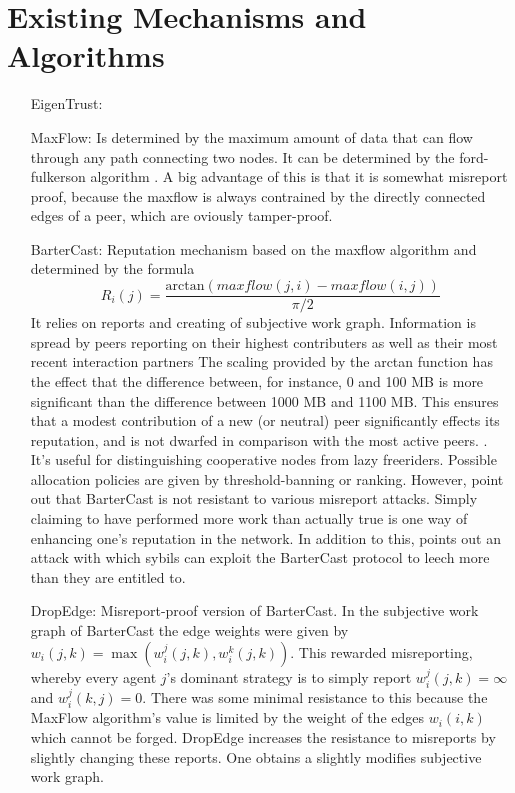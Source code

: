 \documentclass[11pt,a4paper]{article}
\theoremstyle{definition}
\theoremstyle{theorem}
\theoremstyle{proposition}
\theoremstyle{corollary}
\theoremstyle{lemma}
\theoremstyle{example}
\theoremstyle{remark}
\begin{document}
\section{Existing Mechanisms and Algorithms}
\label{sec:Existing Mechanisms and Algorithms}
\begin{enumerate}
\item[EigenTrust:]
\item[MaxFlow:] Is determined by the maximum amount of data that can flow through any path connecting two nodes. It can be determined by the ford-fulkerson algorithm \cite{Bartercast: A Practical Approach to Prevent Lazy Freeriding in P2P Networks}. A big advantage of this is that it is somewhat misreport proof, because the maxflow is always contrained by the directly connected edges of a peer, which are oviously tamper-proof. 
\item[BarterCast:]Reputation mechanism based on the maxflow algorithm and determined by the formula 
\begin{equation}
R_i(j)=\frac{\textrm{arctan}(maxflow(j,i)-maxflow(i,j))}{\pi/2}
\end{equation}
It relies on reports and creating of subjective work graph. Information is spread by peers reporting on their highest contributers as well as their most recent interaction partners
The scaling provided by the arctan function has the effect that the difference between, for instance, 0 and 100 MB is more significant than the difference between 1000 MB and 1100 MB. This ensures that a modest contribution of a new (or neutral) peer significantly effects its reputation, and is not dwarfed in comparison with the most active peers. \cite{Bartercast: A Practical Approach to Prevent Lazy Freeriding in P2P Networks}. It's useful for distinguishing cooperative nodes from lazy freeriders. Possible allocation policies are given by threshold-banning or ranking. However, \cite{Accounting Mechanisms for Distributed Work Systems} point out that BarterCast is not resistant to various misreport attacks. Simply claiming to have performed more work than actually true is one way of enhancing one's reputation in the network. In addition to this, \cite{Sybil-resistant Trust Mechanisms in Distributed Systems} points out an attack with which sybils can exploit the BarterCast protocol to leech more than they are entitled to.
\item[DropEdge:] Misreport-proof version of BarterCast. In the subjective work graph of BarterCast the edge weights were given by $w_i(j,k)=\max(w_i^j(j,k), w_i^k(j,k))$. This rewarded misreporting, whereby every agent $j$'s dominant strategy is to simply report $w_i^j(j,k)=\infty$ and $w_i^j(k,j)=0$. There was some minimal resistance to this because the MaxFlow algorithm's value is limited by the weight of the edges $w_i(i,k)$ which cannot be forged. DropEdge increases the resistance to misreports by slightly changing these reports. One obtains a slightly modifies subjective work graph.

\end{enumerate}
\end{document}
